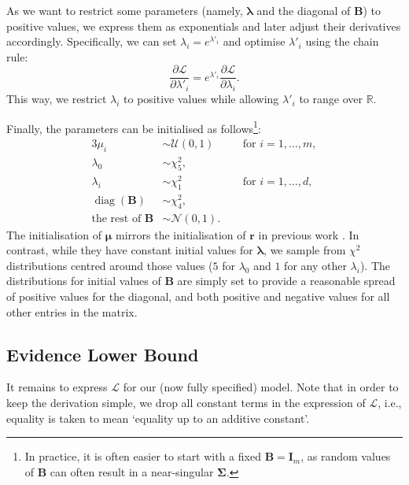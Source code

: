 \documentclass{mpaper}
\DeclareMathOperator{\diag}{diag}
\begin{document}
As we want to restrict some parameters (namely, $\bm\lambda$ and the diagonal of
$\mathbf{B}$) to positive values, we express them as exponentials and later
adjust their derivatives accordingly. Specifically, we can set $\lambda_i =
e^{\lambda'_i}$ and optimise $\lambda'_i$ using the chain rule:
\begin{equation} \label{eq:transformation}
  \frac{\partial \mathcal{L}}{\partial \lambda'_i} = e^{\lambda'_i}
  \frac{\partial \mathcal{L}}{\partial \lambda_i}.
\end{equation}
This way, we restrict $\lambda_i$ to positive values while allowing $\lambda'_i$
to range over $\mathbb{R}$.

Finally, the parameters can be initialised as follows\footnote{In practice, it
  is often easier to start with a fixed $\mathbf{B} = \mathbf{I}_m$, as random
  values of $\mathbf{B}$ can often result in a near-singular $\bm\Sigma$.}:
\begin{alignat}{3}
  \mu_i &\sim \mathcal{U}(0, 1) \quad &&\text{for } i = 1, \dots, m, \label{eq:first_initialisation} \\
  \lambda_0 &\sim \chi^2_5, && \\
  \lambda_i &\sim \chi^2_1 \quad &&\text{for } i = 1, \dots, d, \\
  \diag(\mathbf{B}) &\sim \chi^2_4, && \\
  \text{the rest of } \mathbf{B} &\sim \mathcal{N}(0, 1). \label{eq:last_initialisation} &&
\end{alignat}
The initialisation of $\bm\mu$ mirrors the initialisation of $\mathbf{r}$ in
previous work \cite{DBLP:conf/nips/LevinePK11}. In contrast, while they have
constant initial values for $\bm\lambda$, we sample from $\chi^2$ distributions
centred around those values ($5$ for $\lambda_0$ and $1$ for any other
$\lambda_i$). The distributions for initial values of $\mathbf{B}$ are simply
set to provide a reasonable spread of positive values for the diagonal, and both
positive and negative values for all other entries in the matrix.

\subsection{Evidence Lower Bound} \label{sec:elbo}

It remains to express $\mathcal{L}$ for our (now fully specified) model. Note
that in order to keep the derivation simple, we drop all constant terms in the
expression of $\mathcal{L}$, i.e., equality is taken to mean `equality up to an
additive constant'.
\end{document}

